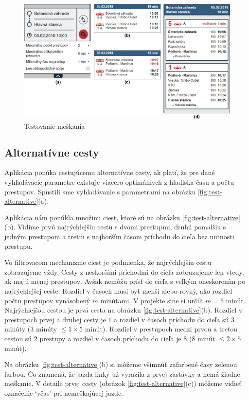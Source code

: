 \begin{figure}[H]
\centerline{\includegraphics[width=1.0\textwidth]{images/test/delay}}
\caption[Testovanie meškania]{Testovanie meškania}
\label{fig:test-delay}
\end{figure}

\subsection{Alternatívne cesty}
Aplikácia ponúka cestujúcemu alternatívne cesty, ak platí, že pre dané vyhľadávacie parametre existuje viacero optimálnych z hľadiska času a počtu prestupov. Spustili sme vyhľadávanie s parametrami na obrázku \ref{fig:test-alternative}(a). 

Aplikácia nám ponúkla množinu ciest, ktoré sú na obrázku \ref{fig:test-alternative}(b). Vidíme prvú najrýchlejšiu cestu s dvomi prestupmi, druhú pomalšiu s jedným prestupom a tretiu s najhorším časom príchodu do cieľa bez nutnosti prestupu. 

Vo filtrovacom mechanizme ciest je podmienka, že najrýchlejšiu cestu zobrazujeme vždy. Cesty z neskoršími príchodmi do cieľa zobrazujeme len vtedy, ak majú menej prestupov. Avšak nemôžu prísť do cieľa s veľkým oneskorením po najrýchlejšej ceste. Rozdiel v časoch musí byť menší alebo rovný, ako rozdiel počtu prestupov vynásobený $m$ minútami. V projekte sme si určili $m = 5$ minút. Najrýchlejšou cestou je prvá cesta na obrázku \ref{fig:test-alternative}(b). Rozdiel v prestupoch prvej a druhej cesty je $1$ a rozdiel v časoch príchodu do cieľa sú $3$ minúty ($3$ minúty $\leq 1\times5$ minút).
Rozdiel v prestupoch medzi prvou a treťou cestou sú $2$ prestupy a rozdiel v časoch príchodu do cieľa je $8$ ($8$ minút $\leq 2\times5$ minút).

Na obrázku \ref{fig:test-alternative}(b) si môžeme všimnúť zafarbené časy zelenou farbou. Čo znamená, že jazda linky už vyrazila z prvej zastávky a nemá žiadne meškanie. V detaile prvej cesty (obrázok \ref{fig:test-alternative}(c)) môžeme vidieť označenie `včas' pri nemeškajúcej jazde.


